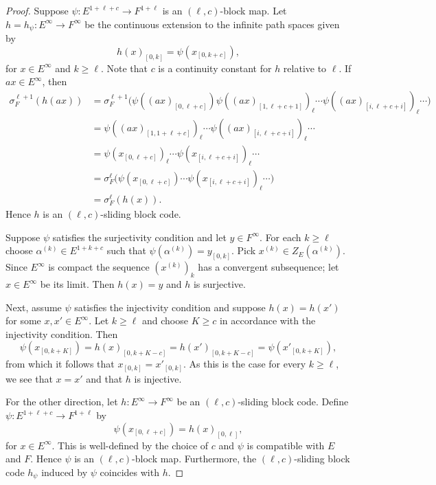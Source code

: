 \documentclass[12pt,a4paper,oneside,reqno,final]{amsart}
\newcommand{\LRA}{\longrightarrow}
\let\geq\geqslant{}
\theoremstyle{definition}
\numberwithin{equation}{section} %
\begin{document}
\begin{proof}
    Suppose $\psi\colon E^{1 + \ell + c}\LRA F^{1 + \ell}$ is an $(\ell, c)$-block map.
    Let $h = h_\psi\colon E^\infty \LRA F^\infty$ be the continuous extension to the infinite path spaces given by
    \[
      {h(x)}_{[0, k]} = \psi(x_{[0, k + c]}),
    \]
    for $x\in E^\infty$ and $k\geq \ell$.
    Note that $c$ is a continuity constant for $h$ relative to $\ell$.
    If $ax\in E^\infty$, then
    \begin{align*}
        \sigma_F^{\ell + 1}(h(ax)) 
        &= \sigma_F^{\ell + 1}
        \Big( 
        {\psi( {(ax)}_{[0, \ell + c]})} {\psi( {(ax)}_{[1, \ell + c + 1]})}_{\ell} \cdots {\psi( {(ax)}_{[i, \ell + c + i]})}_{\ell} \cdots 
        \Big) \\
        &= {\psi( {(ax)}_{[1, 1 + \ell + c]})}_{\ell} \cdots {\psi( {(ax)}_{[i, \ell + c + i]})}_{\ell}\cdots \\
        &= {\psi( x_{[0, \ell + c]})}_{\ell} \cdots {\psi( x_{[i, \ell + c + i]})}_{\ell}\cdots \\
        &= \sigma_F^\ell
        \Big( 
        \psi(x_{[0, \ell + c]}) \cdots {\psi( x_{[i, \ell + c + i]})}_{\ell}\cdots 
        \Big) \\
        &= \sigma_F^\ell(h(x)).
    \end{align*}
    Hence $h$ is an $(\ell, c)$-sliding block code.

Suppose $\psi$ satisfies the surjectivity condition and let $y\in F^\infty$.
For each $k\geq \ell$ choose $\alpha^{(k)}\in E^{1 + k + c}$ such that $\psi(\alpha^{(k)}) = y_{[0, k]}$.
Pick $x^{(k)}\in Z_E(\alpha^{(k)})$.
Since $E^\infty$ is compact the sequence ${(x^{(k)})}_k$ has a convergent subsequence;
let $x\in E^\infty$ be its limit. 
Then $h(x) = y$ and $h$ is surjective.

Next, assume $\psi$ satisfies the injectivity condition and suppose $h(x) = h(x')$ for some $x, x'\in E^\infty$.
Let $k\geq \ell$ and choose $K\geq c$ in accordance with the injectivity condition.
Then 
\[
    \psi(x_{[0, k + K]})  = {h(x)}_{[0, k + K - c]} = {h(x')}_{[0, k + K - c]}
    = \psi(x'_{[0, k + K]}),
\]
from which it follows that $x_{[0, k]} = x'_{[0, k]}$.
As this is the case for every $k\geq \ell$, we see that $x = x'$ and that $h$ is injective.

    
For the other direction, let $h\colon E^\infty\LRA F^\infty$ be an $(\ell, c)$-sliding block code.
 Define $\psi\colon E^{1 + \ell + c}\LRA F^{1 + \ell}$ by
\[
  \psi(x_{[0, \ell + c]}) = {h(x)}_{[0, \ell]},
\]
for $x\in E^{\infty}$.
This is well-defined by the choice of $c$ and $\psi$ is compatible with $E$ and $F$.
Hence $\psi$ is an $(\ell, c)$-block map.
Furthermore, the $(\ell, c)$-sliding block code $h_\psi$ induced by $\psi$ coincides with $h$.


\end{proof}
\end{document}

